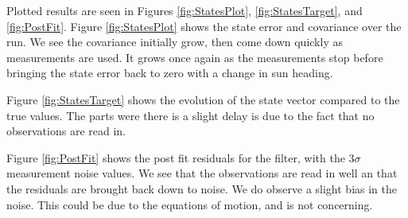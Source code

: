 \documentclass[]{BasiliskReportMemo}
\begin{document}
Plotted results are seen in Figures \ref{fig:StatesPlot}, \ref{fig:StatesTarget}, and \ref{fig:PostFit}. Figure \ref{fig:StatesPlot} shows the state error and covariance over the run. We see the covariance initially grow, then come down quickly as measurements are used. It grows once again as the measurements stop before bringing the state error back to zero with a change in sun heading. 

Figure \ref{fig:StatesTarget} shows the evolution of the state vector compared to the true values. The parts were there is a slight delay is due to the fact that no observations are read in. 

Figure \ref{fig:PostFit} shows the post fit residuals for the filter, with the $3\sigma$ measurement noise values. We see that the observations are read in well an that the residuals are brought back down to noise. We do observe a slight bias in the noise. This could be due to the equations of motion, and is not concerning.




\end{document}

